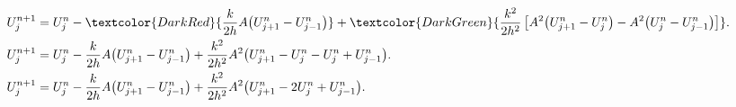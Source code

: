 \begin{frame}
  \frametitle{\secname}

  \begin{proofs}
    \begin{align*}
      U^{n+1}_{j} & =
      U^{n}_{j}-
      \textcolor{DarkRed}{
        \frac{k}{2h}
        A
        \big(
        U^{n}_{j+1}-
        U^{n}_{j-1}
        \big)
      }+
      \textcolor{DarkGreen}{
        \frac{k^{2}}{2h^{2}}
        \left[
          A^{2}
          \big(
          U^{n}_{j+1}-
          U^{n}_{j}
          \big)-
          A^{2}
          \big(
          U^{n}_{j}-
          U^{n}_{j-1}
          \big)
          \right]
      }.              \\
      U^{n+1}_{j} & =
      U_{j}^{n}-
      \frac{k}{2h}
      A
      \big(
      U^{n}_{j+1}-
      U^{n}_{j-1}
      \big)+
      \frac{k^{2}}{2h^{2}}
      A^{2}
      \big(
      U^{n}_{j+1}-
      U^{n}_{j}-
      U^{n}_{j}+
      U^{n}_{j-1}
      \big).          \\
      U^{n+1}_{j} & =
      U_{j}^{n}-
      \frac{k}{2h}
      A
      \big(
      U^{n}_{j+1}-
      U^{n}_{j-1}
      \big)+
      \frac{k^{2}}{2h^{2}}
      A^{2}
      \big(
      U^{n}_{j+1}-
      2U^{n}_{j}+
      U^{n}_{j-1}
      \big).
    \end{align*}
  \end{proofs}
\end{frame}

